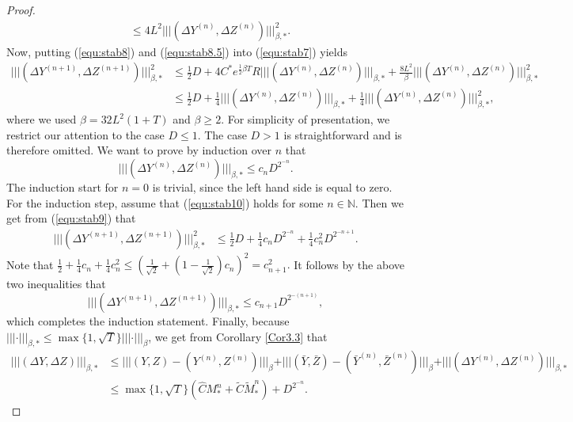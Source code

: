 \documentclass[10pt,a4paper]{article}
\theoremstyle{plain}
\theoremstyle{definition}
\numberwithin{equation}{section}
\newcommand{\trinm}[1]{\vert\!\vert\!\vert #1 \vert\!\vert\!\vert}
\begin{document}
\begin{proof}
\begin{align}
&\leq 4L^{2}\trinm{(\Delta Y^{(n)},\Delta Z^{(n)})}_{\beta,*}^{2}. \label{equ:stab8.5}
\end{align}
Now, putting (\ref{equ:stab8}) and (\ref{equ:stab8.5}) into (\ref{equ:stab7}) yields
\begin{align}
\trinm{(\Delta Y^{(n+1)},\Delta Z^{(n+1)})}_{\beta,*}^{2} &\leq \tfrac{1}{2}D + 4C^{*}e^{\tfrac{1}{2}\beta T}R\trinm{(\Delta Y^{(n)},\Delta Z^{(n)})}_{\beta,*} + \tfrac{8L^{2}}{\beta}\trinm{ (\Delta Y^{(n)},\Delta Z^{(n)})}_{\beta,*}^{2} \nonumber \\
&\leq \tfrac{1}{2}D +\tfrac{1}{4}\trinm{(\Delta Y^{(n)},\Delta Z^{(n)})}_{\beta,*} + \tfrac{1}{4}\trinm{(\Delta Y^{(n)},\Delta Z^{(n)})}_{\beta,*}^{2}, \label{equ:stab9}
\end{align}
where we used $\beta = 32L^{2}(1+T)$ and $\beta \geq 2$.
For simplicity of presentation, we restrict our attention to the case \(D\leq 1\). The case \(D>1\) is straightforward and is therefore omitted. We want to prove by induction over $n$ that
\begin{equation}
\label{equ:stab10}
\trinm{(\Delta Y^{(n)},\Delta Z^{(n)})}_{\beta,*} \leq c_n D^{2^{-n}}.
\end{equation}
The induction start for $n=0$ is trivial, since the left hand side is equal to zero. For the induction step, assume that (\ref{equ:stab10}) holds for some $n \in \mathbb{N}$. Then we get from (\ref{equ:stab9}) that
\begin{align*}
\trinm{(\Delta Y^{(n+1)},\Delta Z^{(n+1)})}_{\beta,*}^{2} &\leq \tfrac{1}{2}D + \tfrac{1}{4} c_n D^{2^{-n}} + \tfrac{1}{4} c_n^2 D^{2^{-n+1}}. 
\end{align*}
Note that 
$
\frac12 + \frac14 c_n + \frac14 c_n^2 \le (\frac{1}{\sqrt{2}} + (1- \frac{1}{\sqrt{2}})c_n)^2 = c_{n+1}^2.
$
It follows by the above two inequalities that
\[
\trinm{(\Delta Y^{(n+1)},\Delta Z^{(n+1)})}_{\beta,*} \leq c_{n+1} D^{2^{-(n+1)}},
\]
which completes the induction statement. Finally, because $\trinm{\cdot}_{\beta,*} \leq \max\{1,\sqrt{T}\}\trinm{\cdot}_{\beta}$, we get from Corollary \ref{Cor3.3} that
\begin{align*}
\trinm{(\Delta Y,\Delta Z)}_{\beta,*}  &\leq \trinm{(Y,Z)-(Y^{(n)},Z^{(n)}) }_\beta + \trinm{(\bar{Y},\bar{Z})-(\bar{Y}^{(n)},\bar{Z}^{(n)})  }_{\beta}  + \trinm{(\Delta Y^{(n)},\Delta Z^{(n)})}_{\beta,*} \\
&\leq \max\{1,\sqrt{T}\}(\hat{C}M_{*}^{n} + \tilde{C}\tilde{M}_{*}^{n}) + D^{2^{-n}}.
\end{align*}
\end{proof}
\end{document}
